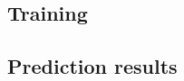 \documentclass[amt, manuscript]{copernicus}
\begin{document}
\subsection{Training}

\subsection{Prediction results}


\conclusions  %













\appendix
\section{}    %

\subsection{}     %


\noappendix       %


\end{document}
